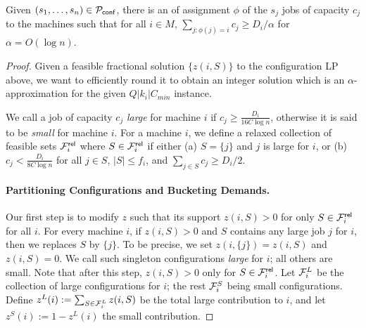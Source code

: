 \documentclass{article}[11pt]
\def\Supp{\mathsf{Supp}\xspace}
\def\cckp{$Q|k_i|C_{min}$\xspace}
\newcommand{\bc}{{\bar c}}
\newcommand{\barD}{{\bar D}}
\begin{document}
\begin{theorem}\label{thm:conflprounding}
	Given $(s_1,\ldots,s_n) \in {\cal P}_\mathsf{conf}$, there is an of assignment $\phi$ of the $s_j$ jobs of capacity $c_j$  to the machines such that for all $i\in M$, 
	$\sum_{j:\phi(j) = i} c_j \geq D_i/\alpha$ for $\alpha = O(\log n)$.
\end{theorem}
\def\calFr{\calF^{\mathsf{rel}}}
\begin{proof}
		Given a feasible fractional solution $\{z(i,S)\}$ to the configuration LP above, we want to  efficiently round it to obtain an integer solution which is an $\alpha$-approximation for the given \cckp instance.
		\medskip 
		
		We call a job of capacity $c_j$ {\em large} for machine $i$ if $c_j \geq \frac{D_i}{16C\log n}$, otherwise it is said to be \emph{small} for machine $i$. 
		For a machine $i$, we define a relaxed collection of feasible sets $\calFr_i$ where $S\in \calFr_i$ if either (a) $S = \{j\}$ and $j$ is large for $i$, or (b) $c_j < \frac{D_i}{8C\log n}$ for all $j\in S$, $|S| \leq f_i$, and $\sum_{j\in S} c_j \geq D_i/2$.
	
		

%		
%				
\paragraph{Partitioning Configurations  and Bucketing Demands.}	
Our first step is  to modify $z$ such that its support $z(i,S) > 0$ for only $S\in \calFr_i$ for all $i$.
For every machine $i$, if $z(i,S) > 0$ and $S$ contains any large job $j$ for $i$, then we replaces $S$ by $\{j\}$. To be precise, we set $z(i,\{j\}) = z(i,S)$ and $z(i,S) = 0$.
We call such singleton configurations {\em large} for $i$; all others are small. Note that after this step, $z(i,S) > 0$ only for $S\in \calFr_i$.
Let ${\cal F}^L_i$ be the collection of large configurations for $i$; the rest ${\cal F}^S_i$ being small configurations.
		Define $z^L(i) := \sum_{S\in {\cal F}^L_i} z(i,S)$ be the total large contribution to $i$, and let $z^S(i) := 1 - z^L(i)$ the small contribution.



\end{proof}
\end{document}
